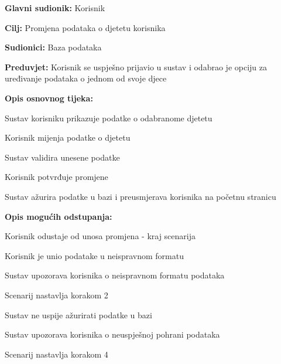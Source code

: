 					\noindent {}
					\begin{packed_item}
	
						\item \textbf{Glavni sudionik: }Korisnik
						\item  \textbf{Cilj:} Promjena podataka o djetetu korisnika
						\item  \textbf{Sudionici:} Baza podataka
						\item  \textbf{Preduvjet:} Korisnik se uspješno prijavio u sustav i odabrao je opciju za uređivanje podataka o jednom od svoje djece
						\eject
						\item  \textbf{Opis osnovnog tijeka:}
						
						\item[] \begin{packed_enum}
							\item Sustav korisniku prikazuje podatke o odabranome djetetu
							\item Korisnik mijenja podatke o djetetu
							\item Sustav validira unesene podatke
							\item Korisnik potvrđuje promjene
							\item Sustav ažurira podatke u bazi i preusmjerava korisnika na početnu stranicu
						\end{packed_enum}

						\item  \textbf{Opis mogućih odstupanja:}

						\item[] \begin{packed_item}
							\item[2.a] Korisnik odustaje od unosa promjena - kraj scenarija
							\item[3.a] Korisnik je unio podatake u neispravnom formatu
							\item[] \begin{packed_enum}
								\item Sustav upozorava korisnika o neispravnom formatu podataka
								\item Scenarij nastavlja korakom 2 
							\end{packed_enum}	
							\item[5.a] Sustav ne uspije ažurirati podatke u bazi
							\item[] \begin{packed_enum}
								\item Sustav upozorava korisnika o neuspješnoj pohrani podataka
								\item Scenarij nastavlja korakom 4
							\end{packed_enum}					
						\end{packed_item}
					\end{packed_item}
					
